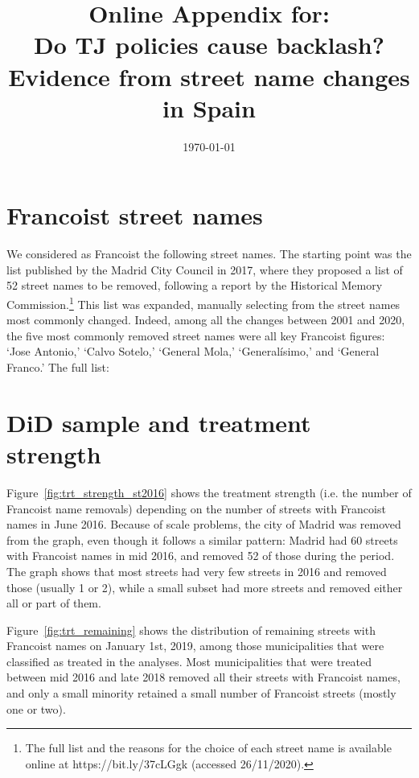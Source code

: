 \documentclass[12pt, titlepage]{article}
\title{\Large Online Appendix for:\\Do TJ policies cause backlash?\\Evidence from street name changes in Spain}
\author{}
\date{\today}
\begin{document}
\maketitle

\tableofcontents


\clearpage
\section{Francoist street names}\label{franc_names_list}

We considered as Francoist the following street names. The starting point was the list published by the Madrid City Council in 2017, where they proposed a list of 52 street names to be removed, following a report by the Historical Memory Commission.\footnote{The full list and the reasons for the choice of each street name is available online at https://bit.ly/37cLGgk (accessed 26/11/2020).}
This list was expanded, manually selecting from the street names most commonly changed.
Indeed, among all the changes between 2001 and 2020, the five most commonly removed street names were all key Francoist figures: `Jose Antonio,' `Calvo Sotelo,' `General Mola,' `Generalísimo,' and `General Franco.' The full list:

\begin{quote}
  
\end{quote}

\clearpage
\section{DiD sample and treatment strength}

Figure~\ref{fig:trt_strength_st2016} shows the treatment strength (i.e. the number of Francoist name removals) depending on the number of streets with Francoist names in June 2016. Because of scale problems, the city of Madrid was removed from the graph, even though it follows a similar pattern: Madrid had 60 streets with Francoist names in mid 2016, and removed 52 of those during the period.
The graph shows that most streets had very few streets in 2016 and removed those (usually 1 or 2), while a small subset had more streets and removed either all or part of them.

Figure~\ref{fig:trt_remaining} shows the distribution of remaining streets with Francoist names on January 1st, 2019, among those municipalities that were classified as treated in the analyses.
Most municipalities that were treated between mid 2016 and late 2018 removed all their streets with Francoist names, and only a small minority retained a small number of Francoist streets (mostly one or two).
\end{document}
